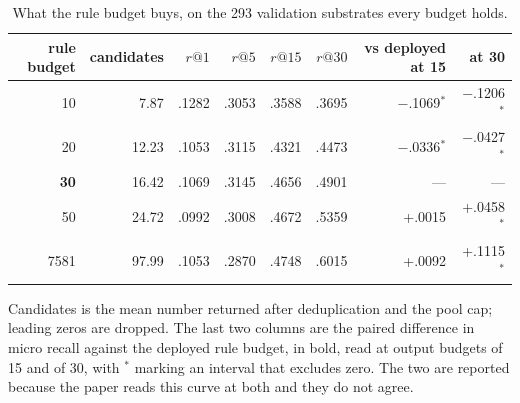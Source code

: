 \begin{table}[h]
\centering\small
\begin{threeparttable}
\caption{What the rule budget buys, on the 293 validation substrates every budget holds.}
\label{tab:si-budget}
\begin{tabular}{rrrrrrrr}
\toprule
rule budget & candidates & $r@1$ & $r@5$ & $r@15$ & $r@30$ & vs deployed at 15 & at 30 \\
\midrule
10 & 7.87 & .1282 & .3053 & .3588 & .3695 & $-$.1069$^{*}$ & $-$.1206$^{*}$ \\
20 & 12.23 & .1053 & .3115 & .4321 & .4473 & $-$.0336$^{*}$ & $-$.0427$^{*}$ \\
\textbf{30} & 16.42 & .1069 & .3145 & .4656 & .4901 & --- & --- \\
50 & 24.72 & .0992 & .3008 & .4672 & .5359 & +.0015 & +.0458$^{*}$ \\
7581 & 97.99 & .1053 & .2870 & .4748 & .6015 & +.0092 & +.1115$^{*}$ \\
\bottomrule
\end{tabular}
\begin{tablenotes}[flushleft]\footnotesize
\item Candidates is the mean number returned after deduplication and the pool cap; leading zeros are dropped. The last two columns are the paired difference in micro recall against the deployed rule budget, in bold, read at output budgets of 15 and of 30, with $^{*}$ marking an interval that excludes zero. The two are reported because the paper reads this curve at both and they do not agree.
\end{tablenotes}
\end{threeparttable}
\end{table}
